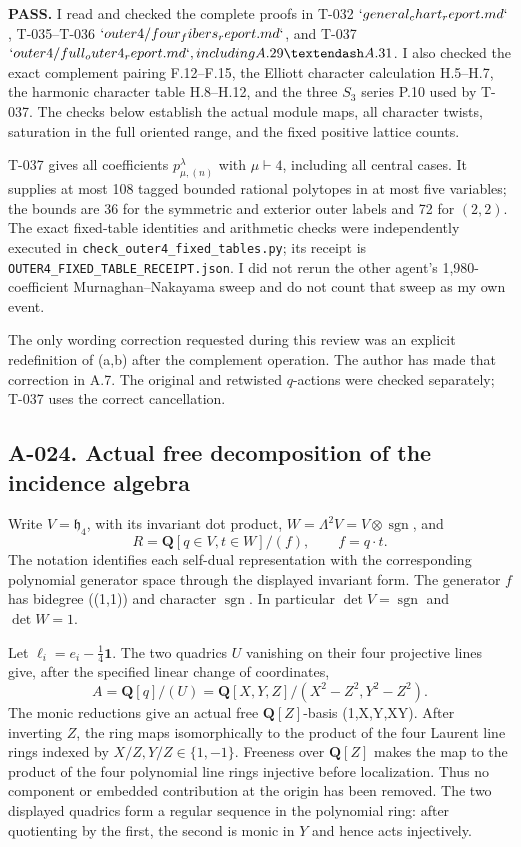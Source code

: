 \documentclass[
  10pt,
]{article}
\begin{document}
\textbf{PASS.} I read and checked the complete proofs in T-032
\(`general_chart_report.md`\), T-035--T-036
\(`outer4/four_fibers_report.md`\), and T-037
\(`outer4/full_outer4_report.md`, including A.29–A.31\). I also checked
the exact complement pairing F.12--F.15, the Elliott character
calculation H.5--H.7, the harmonic character table H.8--H.12, and the
three \(S_3\) series P.10 used by T-037. The checks below establish the
actual module maps, all character twists, saturation in the full
oriented range, and the fixed positive lattice counts.

T-037 gives all coefficients \(p_{\mu,(n)}^\lambda\) with
\(\mu\vdash4\), including all central cases. It supplies at most 108
tagged bounded rational polytopes in at most five variables; the bounds
are 36 for the symmetric and exterior outer labels and 72 for \((2,2)\).
The exact fixed-table identities and arithmetic checks were
independently executed in
\texttt{\small check\_\allowbreak{}outer4\_\allowbreak{}fixed\_\allowbreak{}tables.py};
its receipt is
\texttt{\small OUTER4\_\allowbreak{}FIXED\_\allowbreak{}TABLE\_\allowbreak{}RECEIPT.json}.
I did not rerun the other agent's 1,980-coefficient Murnaghan--Nakayama
sweep and do not count that sweep as my own event.

The only wording correction requested during this review was an explicit
redefinition of (a,b) after the complement operation. The author has
made that correction in A.7. The original and retwisted \(q\)-actions
were checked separately; T-037 uses the correct cancellation.

\subsection{A-024. Actual free decomposition of the incidence
algebra}\label{a-024.-actual-free-decomposition-of-the-incidence-algebra}

Write \(V=\mathfrak h_4\), with its invariant dot product,
\(W=\Lambda^2V=V\otimes\operatorname{sgn}\), and \[
R=\mathbf Q[q\in V,t\in W]/(f),\qquad f=q\cdot t.
\] The notation identifies each self-dual representation with the
corresponding polynomial generator space through the displayed invariant
form. The generator \(f\) has bidegree ((1,1)) and character
\(\operatorname{sgn}\). In particular \(\det V=\operatorname{sgn}\) and
\(\det W=1\).

Let \(\ell_i=e_i-\frac14\mathbf1\). The two quadrics \(U\) vanishing on
their four projective lines give, after the specified linear change of
coordinates, \[
A=\mathbf Q[q]/(U)
=\mathbf Q[X,Y,Z]/(X^2-Z^2,Y^2-Z^2).
\] The monic reductions give an actual free \(\mathbf Q[Z]\)-basis
(1,X,Y,XY). After inverting \(Z\), the ring maps isomorphically to the
product of the four Laurent line rings indexed by
\(X/Z,Y/Z\in\{1,-1\}\). Freeness over \(\mathbf Q[Z]\) makes the map to
the product of the four polynomial line rings injective before
localization. Thus no component or embedded contribution at the origin
has been removed. The two displayed quadrics form a regular sequence in
the polynomial ring: after quotienting by the first, the second is monic
in \(Y\) and hence acts injectively.
\end{document}
